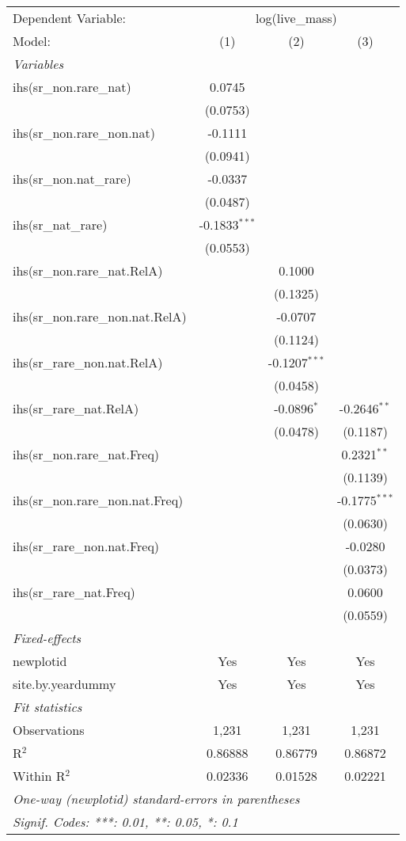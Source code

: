 \begin{tabular}{lccc}
\tabularnewline\midrule\midrule
Dependent Variable:&\multicolumn{3}{c}{log(live\_mass)}\\
Model:&(1) & (2) & (3)\\
\midrule \emph{Variables}&   &   &  \\
ihs(sr\_non.rare\_nat)&0.0745 &    &   \\
  &(0.0753) &    &   \\
ihs(sr\_non.rare\_non.nat)&-0.1111 &    &   \\
  &(0.0941) &    &   \\
ihs(sr\_non.nat\_rare)&-0.0337 &    &   \\
  &(0.0487) &    &   \\
ihs(sr\_nat\_rare)&-0.1833$^{***}$ &    &   \\
  &(0.0553) &    &   \\
ihs(sr\_non.rare\_nat.RelA)&   & 0.1000 &   \\
  &   & (0.1325) &   \\
ihs(sr\_non.rare\_non.nat.RelA)&   & -0.0707 &   \\
  &   & (0.1124) &   \\
ihs(sr\_rare\_non.nat.RelA)&   & -0.1207$^{***}$ &   \\
  &   & (0.0458) &   \\
ihs(sr\_rare\_nat.RelA)&   & -0.0896$^{*}$ & -0.2646$^{**}$\\
  &   & (0.0478) & (0.1187)\\
ihs(sr\_non.rare\_nat.Freq)&   &    & 0.2321$^{**}$\\
  &   &    & (0.1139)\\
ihs(sr\_non.rare\_non.nat.Freq)&   &    & -0.1775$^{***}$\\
  &   &    & (0.0630)\\
ihs(sr\_rare\_non.nat.Freq)&   &    & -0.0280\\
  &   &    & (0.0373)\\
ihs(sr\_rare\_nat.Freq)&   &    & 0.0600\\
  &   &    & (0.0559)\\
\midrule \emph{Fixed-effects}&   &   &  \\
newplotid & Yes & Yes & Yes\\
site.by.yeardummy & Yes & Yes & Yes\\
\midrule \emph{Fit statistics}&  & & \\
Observations & 1,231&1,231&1,231\\
R$^2$ & 0.86888&0.86779&0.86872\\
Within R$^2$ & 0.02336&0.01528&0.02221\\
\midrule\midrule\multicolumn{4}{l}{\emph{One-way (newplotid) standard-errors in parentheses}}\\
\multicolumn{4}{l}{\emph{Signif. Codes: ***: 0.01, **: 0.05, *: 0.1}}\\
\end{tabular}


